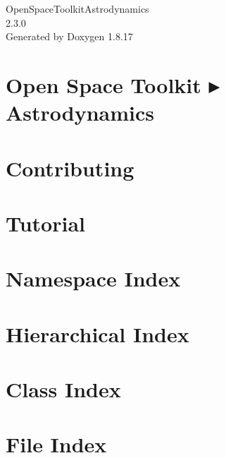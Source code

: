 \let\mypdfximage\pdfximage\def\pdfximage{\immediate\mypdfximage}\documentclass[twoside]{book}
\newcommand{\+}{\discretionary{\mbox{\scriptsize$\hookleftarrow$}}{}{}}
\newcommand{\clearemptydoublepage}{%
  \newpage{\pagestyle{empty}\cleardoublepage}%
}
\begin{document}
\hypersetup{pageanchor=false,
             bookmarksnumbered=true,
             pdfencoding=unicode
            }
\begin{titlepage}
\vspace*{7cm}
\begin{center}%
{\Large Open\+Space\+Toolkit\+Astrodynamics \\[1ex]\large 2.\+3.\+0 }\\
\vspace*{1cm}
{\large Generated by Doxygen 1.8.17}\\
\end{center}
\end{titlepage}
\clearemptydoublepage
{}
\tableofcontents
\clearemptydoublepage
{}
\hypersetup{pageanchor=true}

\chapter{Open Space Toolkit ▸ Astrodynamics}
\label{index}\hypertarget{index}{}
\chapter{Contributing}
\label{md__c_o_n_t_r_i_b_u_t_i_n_g}

\chapter{Tutorial}
\label{md_docs__tutorial}

\chapter{Namespace Index}

\chapter{Hierarchical Index}

\chapter{Class Index}

\chapter{File Index}

\end{document}
